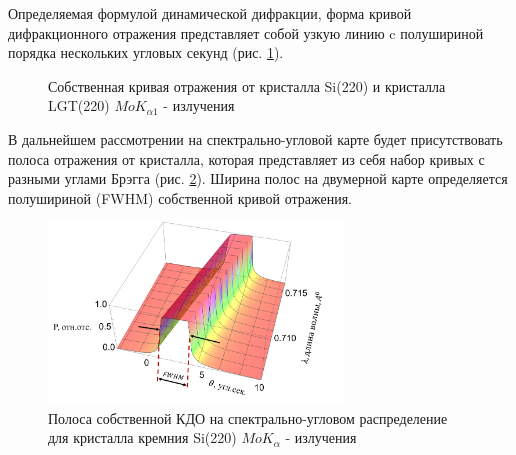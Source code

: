 \label{sec:rocking_curve_section}

Определяемая формулой динамической дифракции, форма кривой дифракционного отражения
представляет собой узкую линию c полушириной порядка нескольких угловых секунд
(рис. \ref{ris:darwin_methody}).


\begin{figure}[H]
  \centering
  \hfill
  \caption{Собственная кривая отражения от кристалла Si(220) и
  кристалла LGT(220) $MoK_{\alpha 1}$ - излучения}
  \label{ris:darwin_methody}
\end{figure}

В дальнейшем рассмотрении на спектрально-угловой карте будет присутствовать
полоса отражения от кристалла, которая представляет из себя набор кривых с
разными углами Брэгга (рис. \ref{ris:darwin_lambda}).
Ширина полос на двумерной карте определяется полушириной (FWHM)
собственной кривой отражения.

\begin{figure}[H]
\centering
\includegraphics[width=0.7\textwidth]{images/darwin_lambda.png}
\caption{Полоса собственной КДО на спектрально-угловом распределение для кристалла
кремния  Si(220) $MoK_{\alpha}$ - излучения }
\label{ris:darwin_lambda}
\end{figure}

